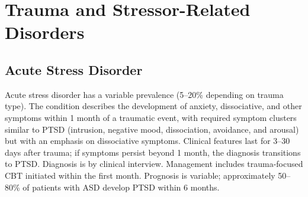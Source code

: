 \section{Trauma and Stressor-Related Disorders}








\label{sec:Trauma and Stressor-Related Disorders}

\subsection{Acute Stress Disorder}
\label{sec:Acute Stress Disorder}
Acute stress disorder has a variable prevalence (5--20\% depending on trauma type). The condition describes the development of anxiety, dissociative, and other symptoms within 1 month of a traumatic event, with required symptom clusters similar to PTSD (intrusion, negative mood, dissociation, avoidance, and arousal) but with an emphasis on dissociative symptoms. Clinical features last for 3--30 days after trauma; if symptoms persist beyond 1 month, the diagnosis transitions to PTSD. Diagnosis is by clinical interview. Management includes trauma-focused CBT initiated within the first month. Prognosis is variable; approximately 50--80\% of patients with ASD develop PTSD within 6 months.

